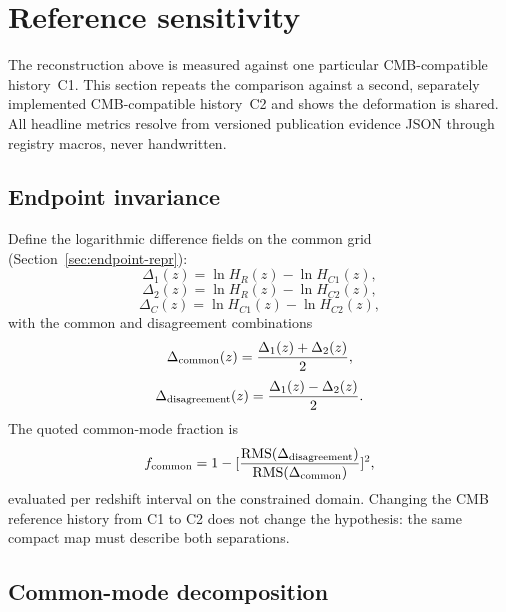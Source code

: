 \section{Reference sensitivity}
\label{sec:reference-sensitivity}

The reconstruction above is
measured against one particular CMB-compatible history~C1. This
section repeats the comparison against a second, separately implemented
CMB-compatible history~C2 and shows the deformation is
shared. All headline metrics resolve from versioned publication evidence JSON through
registry macros, never handwritten.

\subsection{Endpoint invariance}

Define the logarithmic difference fields on the common grid
(Section~\ref{sec:endpoint-repr}):
\begin{equation}
  \Delta_{1}(z)=\ln H_{R}(z)-\ln H_{C1}(z),
  \label{eq:delta1}
\end{equation}
\begin{equation}
  \Delta_{2}(z)=\ln H_{R}(z)-\ln H_{C2}(z),
  \label{eq:delta2}
\end{equation}
\begin{equation}
  \Delta_{C}(z)=\ln H_{C1}(z)-\ln H_{C2}(z),
  \label{eq:deltaC}
\end{equation}
with the common and disagreement combinations
\begin{equation}
  \Delta_{\rm common}(z) = \frac{\Delta_{1}(z)+\Delta_{2}(z)}{2},
  \label{eq:common}
\end{equation}
\begin{equation}
  \Delta_{\rm disagreement}(z) = \frac{\Delta_{1}(z)-\Delta_{2}(z)}{2}.
  \label{eq:disagreement}
\end{equation}
The quoted common-mode fraction is
\begin{equation}
  f_{\rm common}
  =
  1-
  [
  \frac{\mathrm{RMS}(\Delta_{\rm disagreement})}
       {\mathrm{RMS}(\Delta_{\rm common})}
  ]^2,
  \label{eq:fcommon}
\end{equation}
evaluated per redshift interval on the constrained domain.
Changing the CMB reference history from C1 to C2 does not change the
hypothesis: the same compact map must describe both separations.

\subsection{Common-mode decomposition}

